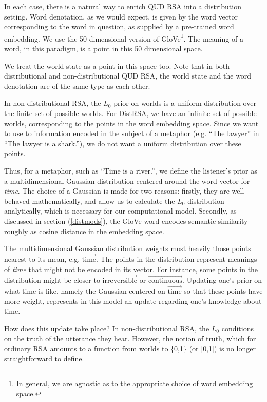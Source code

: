 \documentclass[10pt,letterpaper,twocolumn]{article}
\begin{document}
In each case, there is a natural way to enrich QUD RSA into a distribution setting. Word denotation, as we would expect, is given by the word vector corresponding to the word in question, as supplied by a pre-trained word embedding. We use the 50 dimensional version of GloVe\footnote{In general, we are agnostic as to the appropriate choice of word embedding space.}. The meaning of a word, in this paradigm, is a point in this 50 dimensional space.

We treat the world state as a point in this space too. Note that in both distributional and non-distributional QUD RSA, the world state and the word denotation are of the same type as each other.

In non-distributional RSA, the $L_0$ prior on worlds is a uniform distribution over the finite set of possible worlds. For DistRSA, we have an infinite set of possible worlds, corresponding to the points in the word embedding space. Since we want to use to information encoded in the subject of a metaphor (e.g. ``The lawyer'' in ``The lawyer is a shark.''), we do not want a uniform distribution over these points.

Thus, for a metaphor, such as ``Time is a river.'', we define the listener's prior as a multidimensional Gaussian distribution centered around the word vector for \emph{time}. The choice of a Gaussian is made for two reasons: firstly, they are well-behaved mathematically, and allow us to calculate the $L_0$ distribution analytically, which is necessary for our computational model. Secondly, as discussed in section (\ref{distmods}), the GloVe word encodes semantic similarity roughly as cosine distance in the embedding space. 

The multidimensional Gaussian distribution weights most heavily those points nearest to its mean, e.g. $\overrightarrow{\text{time}}$. The points in the distribution represent meanings of \emph{time} that might not be encoded in its vector. For instance, some points in the distribution might be closer to $\overrightarrow{\text{irreversible}}$ or $\overrightarrow{\text{continuous}}$. Updating one's prior on what time is like, namely the Gaussian centered on $\overrightarrow{\text{time}}$ so that these points have more weight, represents in this model an update regarding one's knowledge about time.

How does this update take place? In non-distributional RSA, the $L_0$ conditions on the truth of the utterance they hear. However, the notion of truth, which for ordinary RSA amounts to a function from worlds to \{0,1\} (or [0,1]) is no longer straightforward to define. 
\end{document}
